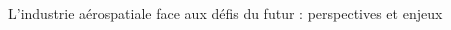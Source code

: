 \documentclass[final]{beamer}
\begin{document}
\begin{frame}
\begin{center}
\begin{minipage}{\textwidth}
\begin{block}{\rule[-0.6ex]{0pt}{50pt}\centering\LARGE L'industrie a\'erospatiale face aux d\'efis du futur : perspectives et enjeux}
\begin{columns}
\begin{column}{0.3\textwidth}
    \begin{center}
\begin{figure}[!h]
\centering
     \\
\end{figure}
     \end{center}
\end{column}
\end{columns}

\end{block}
\end{minipage}
\end{center}
\end{frame}
\end{document}
